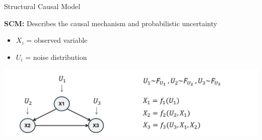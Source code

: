 \documentclass[onlytextwidth,english]{beamer}\usepackage[]{graphicx}\usepackage[]{xcolor}
\begin{document}
% 
% 
% 
% 
% 
% 
% 
\begin{frame}{Structural Causal Model}

\textbf{SCM:} Describes the causal mechanism and probabilistic uncertainty

\vspace{0.2cm}

\begin{itemize}
    \item $X_i$ = observed variable
    \item $U_i$ = noise distribution
\end{itemize}

\vfill

\centering
\includegraphics[width=1\textwidth]{img/SCM.png}

\end{frame}
\end{document}
